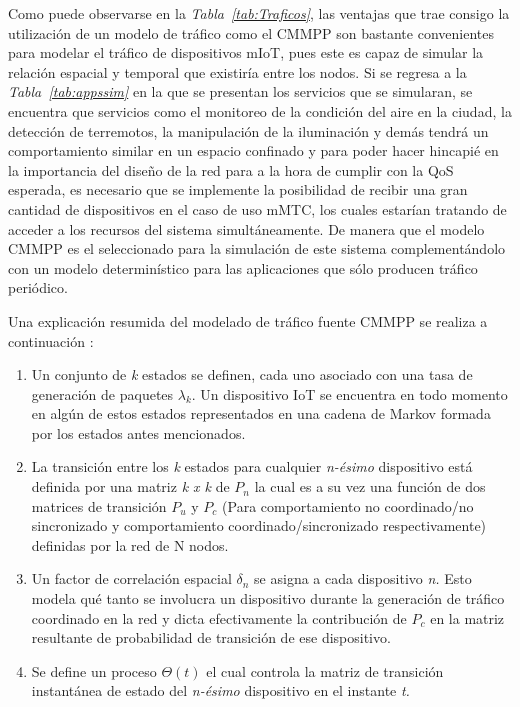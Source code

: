 Como puede observarse en la \textit{Tabla~\ref{tab:Traficos}}, las ventajas que trae consigo la utilización de un modelo de tráfico como el CMMPP son bastante convenientes para modelar el tráfico de dispositivos mIoT, pues este es capaz de simular la relación espacial y temporal que existiría entre los nodos. Si se regresa a la \textit{Tabla~\ref{tab:appssim}} en la que se presentan los servicios que se simularan, se encuentra que servicios como el monitoreo de la condición del aire en la ciudad, la detección de terremotos, la manipulación de la iluminación y demás tendrá un comportamiento similar en un espacio confinado y para poder hacer hincapié en la importancia del diseño de la red para a la hora de cumplir con la QoS esperada, es necesario que se implemente la posibilidad de recibir una gran cantidad de dispositivos en el caso de uso mMTC, los cuales estarían tratando de acceder a los recursos del sistema simultáneamente. De manera que el modelo CMMPP es el seleccionado para la simulación de este sistema complementándolo con un modelo determinístico para las aplicaciones que sólo producen tráfico periódico.\newline

Una explicación resumida del modelado  de tráfico fuente CMMPP se realiza a continuación \parencite{Gupta2018}:

\begin{enumerate}
\item  Un conjunto de \textit{k }estados se definen, cada uno asociado con una tasa de generación de paquetes ${\lambda }_k$. Un dispositivo IoT se encuentra en todo momento en algún de estos estados representados en una cadena de Markov formada por los estados antes mencionados.
\item  La transición entre los \textit{k} estados para cualquier \textit{n-ésimo}\textbf{\textit{ }}dispositivo está definida por una matriz \textit{k x k} de $P_n$ la cual es a su vez una función de dos matrices de transición $P_u$ y $P_c$ (Para comportamiento no coordinado/no sincronizado y comportamiento coordinado/sincronizado respectivamente) definidas por la red de N nodos.
\item  Un factor de correlación espacial ${\delta }_n$ se asigna a cada dispositivo \textit{n. }Esto modela qué tanto se involucra un dispositivo durante la generación de tráfico coordinado en la red y dicta efectivamente la contribución de $P_c$ en la matriz resultante de probabilidad de transición de ese dispositivo.
\item  Se define un proceso $\mathit{\Theta}\left(t\right)$ el cual controla la matriz de  transición instantánea de estado del \textit{n-ésimo}\textbf{\textit{ }}dispositivo en el instante \textit{t.}
\end{enumerate}